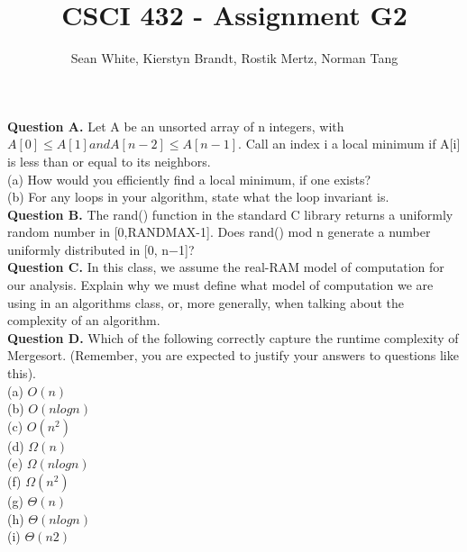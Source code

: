 \documentclass[12pt]{article}
\author{Sean White, Kierstyn Brandt, Rostik Mertz, Norman Tang}
\title{CSCI 432 - Assignment G2}
\begin{document}
\maketitle

\textbf{Question A.} Let A be an unsorted array of n integers, with $A[0] \leq A[1] and A[n−2] \leq A[n − 1]$. Call an index i a local minimum if A[i] is less than or equal to its neighbors.\\

(a) How would you efficiently find a local minimum, if one exists?\\

(b) For any loops in your algorithm, state what the loop invariant is.\\

\textbf{Question B.} The rand() function in the standard C library returns a uniformly random number in [0,RANDMAX-1]. Does rand() mod n generate a number uniformly distributed in [0, n−1]?\\

\textbf{Question C.} In this class, we assume the real-RAM model of computation for our analysis. Explain why we must define what model of computation we are using in an algorithms class, or, more generally, when talking about the complexity of an algorithm.\\

\textbf{Question D.} Which of the following correctly capture the runtime complexity of Mergesort. (Remember, you are expected to justify your answers to questions like this).\\

(a) $O(n)$\\

(b) $O(n log n)$\\

(c) $O(n^2)$\\

(d) $\Omega(n)$\\

(e) $\Omega(n log n)$\\

(f) $\Omega(n^2)$\\

(g) $\Theta(n)$\\

(h) $\Theta(n log n)$\\

(i) $\Theta(n 2)$\\
\end{document}
